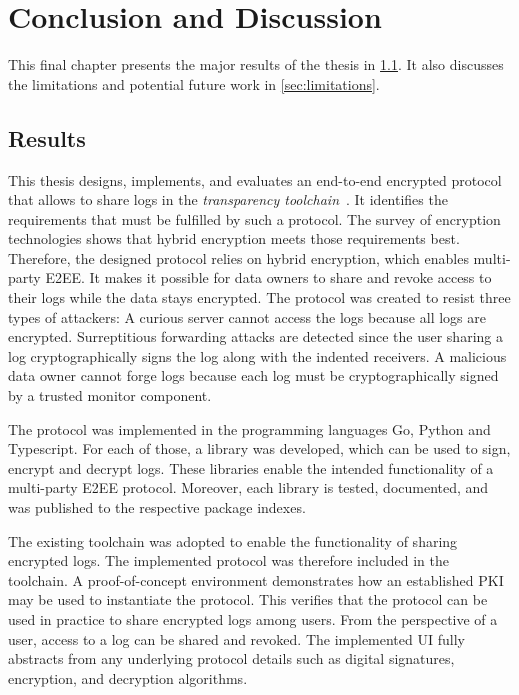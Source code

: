 \documentclass[../main.tex]{subfiles}
\begin{document}
\chapter{Conclusion and Discussion}
\label{chap:conclusion}

This final chapter presents the major results of the thesis in \cref{sec:result}.
It also discusses the limitations and potential future work in \cref{sec:limitations}.

\section{Results}
\label{sec:result}

This thesis designs, implements, and evaluates an end-to-end encrypted protocol that allows to share logs in the \emph{transparency toolchain}~\cite{Zieglmeier2021}.
It identifies the requirements that must be fulfilled by such a protocol.
The survey of encryption technologies shows that hybrid encryption meets those requirements best.
Therefore, the designed protocol relies on hybrid encryption, which enables multi-party E2EE.
It makes it possible for data owners to share and revoke access to their logs while the data stays encrypted.
The protocol was created to resist three types of attackers: 
A curious server cannot access the logs because all logs are encrypted.
Surreptitious forwarding attacks are detected since the user sharing a log cryptographically signs the log along with the indented receivers.
A malicious data owner cannot forge logs because each log must be cryptographically signed by a trusted monitor component.

The protocol was implemented in the programming languages Go, Python and Typescript.
For each of those, a library was developed, which can be used to sign, encrypt and decrypt logs.
These libraries enable the intended functionality of a multi-party E2EE protocol.
Moreover, each library is tested, documented, and was published to the respective package indexes.

The existing toolchain was adopted to enable the functionality of sharing encrypted logs.
The implemented protocol was therefore included in the toolchain.
A proof-of-concept environment demonstrates how an established PKI may be used to instantiate the protocol.
This verifies that the protocol can be used in practice to share encrypted logs among users.
From the perspective of a user, access to a log can be shared and revoked.
The implemented UI fully abstracts from any underlying protocol details such as digital signatures, encryption, and decryption algorithms.
\end{document}
